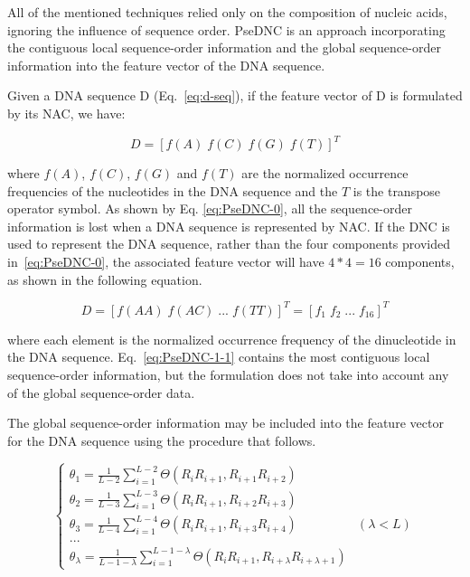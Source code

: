 
All of the mentioned techniques relied only on the composition of nucleic acids, ignoring the influence of sequence order. \gls{PseDNC} is an approach incorporating the contiguous local sequence-order information and the global sequence-order information into the feature vector of the \gls{DNA} sequence. 

Given a \gls{DNA} sequence D (Eq.~\ref{eq:d-seq}), if the feature vector of D is formulated by its \gls{NAC}, we have:


\begin{equation}\label{eq:PseDNC-0}
    D = [f(A)\;f(C)\;f(G)\;f(T)]^{T}
\end{equation}

where $f(A)$, $f(C)$, $f(G)$ and $f(T)$ are the normalized occurrence frequencies of the nucleotides in the \gls{DNA} sequence and the $T$ is the transpose operator symbol. As shown by Eq. \ref{eq:PseDNC-0}, all the sequence-order information is lost when a \gls{DNA} sequence is represented by \gls{NAC}. If the \gls{DNC} is used to represent the \gls{DNA} sequence, rather than the four components provided in~\ref{eq:PseDNC-0}, the associated feature vector will have $4 * 4 = 16$ components, as shown in the following equation.

\begin{equation}\label{eq:PseDNC-1-1}
    D = [f(AA)\;f(AC)\;...\;f(TT)]^{T} = [f_{1}\;f_{2} \;...\;f_{16}]^{T}
\end{equation}

where each element is the normalized occurrence frequency of the dinucleotide in the \gls{DNA} sequence. Eq.~\ref{eq:PseDNC-1-1} contains the most contiguous local sequence-order information, but the formulation does not take into account any of the global sequence-order data.

The global sequence-order information may be included into the feature vector for the \gls{DNA} sequence using the procedure that follows.

\begin{equation}\label{eq:PseDNC-thetas}
    \begin{cases}
    \theta_{1} = \frac{1}{L-2} \sum_{i=1}^{L-2}\Theta(R_{i}R_{i+1}, R_{i+1}R_{i+2})
    \\ 
    \theta_{2} = \frac{1}{L-3} \sum_{i=1}^{L-3}\Theta(R_{i}R_{i+1}, R_{i+2}R_{i+3})
    \\ 
    \theta_{3} = \frac{1}{L-4} \sum_{i=1}^{L-4}\Theta(R_{i}R_{i+1}, R_{i+3}R_{i+4}) & (\lambda < L)
    \\
    ...
    \\ 
    \theta_{\lambda} = \frac{1}{L-1-\lambda} \sum_{i=1}^{L-1-\lambda}\Theta(R_{i}R_{i+1}, R_{i+\lambda}R_{i+\lambda+1})
    \end{cases}
\end{equation}

